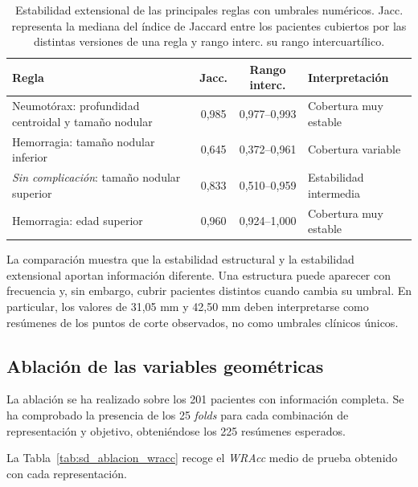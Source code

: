 \begin{table}[!htbp]
\centering
\small
\setlength{\tabcolsep}{5pt}
\renewcommand{\arraystretch}{1.12}
\caption{Estabilidad extensional de las principales reglas con umbrales numéricos. Jacc. representa la mediana del índice de Jaccard entre los pacientes cubiertos por las distintas versiones de una regla y rango interc. su rango intercuartílico.}
\label{tab:estabilidad_extensional_reglas}
\begin{tabularx}{\textwidth}{XccX}
\toprule
\textbf{Regla} &
\textbf{Jacc.} &
\textbf{Rango interc.} &
\textbf{Interpretación} \\
\midrule

Neumotórax: profundidad centroidal y tamaño nodular
& 0,985
& 0,977--0,993
& Cobertura muy estable \\

Hemorragia: tamaño nodular inferior
& 0,645
& 0,372--0,961
& Cobertura variable \\

\textit{Sin complicación}: tamaño nodular superior
& 0,833
& 0,510--0,959
& Estabilidad intermedia \\

Hemorragia: edad superior
& 0,960
& 0,924--1,000
& Cobertura muy estable \\

\bottomrule
\end{tabularx}
\end{table}

La comparación muestra que la estabilidad estructural y la estabilidad extensional aportan información diferente. Una estructura puede aparecer con frecuencia y, sin embargo, cubrir pacientes distintos cuando cambia su umbral. En particular, los valores de 31,05 mm y 42,50 mm deben interpretarse como resúmenes de los puntos de corte observados, no como umbrales clínicos únicos.


\subsection{Ablación de las variables geométricas}
La ablación se ha realizado sobre los 201 pacientes con información completa. Se ha comprobado la presencia de los 25 \textit{folds} para cada combinación de representación y objetivo, obteniéndose los 225 resúmenes esperados.


La Tabla~\ref{tab:sd_ablacion_wracc} recoge el \textit{WRAcc} medio de prueba obtenido con cada representación.

